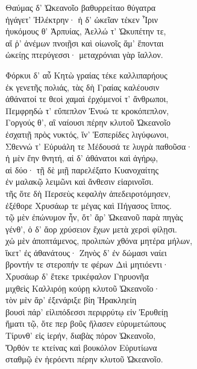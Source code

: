 \begin{pages}
\begin{Leftside}
\quad{}Θαύμας δ' Ὠκεανοῖο βαθυρρείταο θύγατρα \\
ἠγάγετ' Ἠλέκτρην· ἡ δ' ὠκεῖαν τέκεν Ἶριν \\
ἠυκόμους θ' Ἁρπυίας, Ἀελλώ τ' Ὠκυπέτην τε, \\
αἵ ῥ' ἀνέμων πνοιῇσι καὶ οἰωνοῖς ἅμ' ἕπονται\\
ὠκείῃς πτερύγεσσι· μεταχρόνιαι γὰρ ἴαλλον. \\

\smallskip
\begin{center}\end{center}
\smallskip

Φόρκυι δ' αὖ Κητὼ γραίας τέκε καλλιπαρήους \\
ἐκ γενετῆς πολιάς, τὰς δὴ Γραίας καλέουσιν\\
ἀθάνατοί τε θεοὶ χαμαὶ ἐρχόμενοί τ' ἄνθρωποι,\\
Πεμφρηδώ τ' εὔπεπλον Ἐνυώ τε κροκόπεπλον,\\
Γοργούς θ', αἳ ναίουσι πέρην κλυτοῦ Ὠκεανοῖο\\
ἐσχατιῇ πρὸς νυκτός, ἵν' Ἑσπερίδες λιγύφωνοι, \\
Σθεννώ τ' Εὐρυάλη τε Μέδουσά τε λυγρὰ παθοῦσα· \\
ἡ μὲν ἔην θνητή, αἱ δ' ἀθάνατοι καὶ ἀγήρῳ, \\
αἱ δύο· τῇ δὲ μιῇ παρελέξατο Κυανοχαίτης \\
ἐν μαλακῷ λειμῶνι καὶ ἄνθεσιν εἰαρινοῖσι. \\
τῆς ὅτε δὴ Περσεὺς κεφαλὴν ἀπεδειροτόμησεν,  \\
ἐξέθορε Χρυσάωρ τε μέγας καὶ Πήγασος ἵππος.\\
τῷ μὲν ἐπώνυμον ἦν, ὅτ' ἄρ' Ὠκεανοῦ παρὰ πηγὰς\\
γένθ', ὁ δ' ἄορ χρύσειον ἔχων μετὰ χερσὶ φίλῃσι. \\
χὠ μὲν ἀποπτάμενος, προλιπὼν χθόνα μητέρα μήλων,\\
ἵκετ' ἐς ἀθανάτους· Ζηνὸς δ' ἐν δώμασι ναίει  \\
βροντήν τε στεροπήν τε φέρων Διὶ μητιόεντι·\\
Χρυσάωρ δ' ἔτεκε τρικέφαλον Γηρυονῆα\\
μιχθεὶς Καλλιρόῃ κούρῃ κλυτοῦ Ὠκεανοῖο· \\
τὸν μὲν ἄρ' ἐξενάριξε βίη Ἡρακληείη\\
βουσὶ πάρ' εἰλιπόδεσσι περιρρύτῳ εἰν Ἐρυθείῃ \\
ἤματι τῷ, ὅτε περ βοῦς ἤλασεν εὐρυμετώπους \\
Τίρυνθ' εἰς ἱερήν, διαβὰς πόρον Ὠκεανοῖο, \\
Ὄρθόν τε κτείνας καὶ βουκόλον Εὐρυτίωνα\\
σταθμῷ ἐν ἠερόεντι πέρην κλυτοῦ Ὠκεανοῖο.\\


\end{Leftside}
\end{pages}
